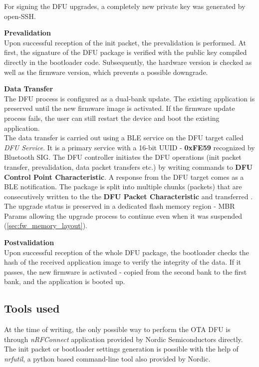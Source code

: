         For signing the DFU upgrades, a completely new private key was generated by open-SSH.
        
        \textbf{Prevalidation}\\
        Upon successful reception of the init packet, the prevalidation is performed. At first, the signature of the DFU package is verified with the public key compiled directly in the bootloader code. Subsequently, the hardware version is checked as well as the firmware version, which prevents a possible downgrade.
        
        \textbf{Data Transfer}\\
        The DFU process is configured as a dual-bank update. The existing application is preserved until the new firmware image is activated. If the firmware update process fails, the user can still restart the device and boot the existing application.\\
        The data transfer is carried out using a BLE service on the DFU target called \textit{DFU Service}. It is a primary service with a 16-bit UUID - \textbf{0xFE59} recognized by Bluetooth SIG. The DFU controller initiates the DFU operations (init packet transfer, prevalidation, data packet transfers etc.) by writing commands to \textbf{DFU Control Point Characteristic}. A response from the DFU target comes as a BLE notification. The package is split into multiple chunks (packets) that are consecutively written to the the \textbf{DFU Packet Characteristic} and transferred \cite{nrf52doc:dfu_service}.\\
        The upgrade status is preserved in a dedicated flash memory region - MBR Params allowing the upgrade process to continue even when it was suspended (\ref{sec:fw_memory_layout}).
        
        \textbf{Postvalidation}\\
        Upon successful reception of the whole DFU package, the bootloader checks the hash of the received application image to verify the integrity of the data. If it passes, the new firmware is activated - copied from the second bank to the first bank, and the application is booted up.  
        
        
    \subsection{Tools used}
        At the time of writing, the only possible way to perform the OTA DFU is through \textit{nRFConnect} application provided by Nordic Semiconductors directly.\\
        The init packet or bootloader settings generation is possible with the help of \textit{nrfutil}, a python based command-line tool also provided by Nordic.

    
    
    


